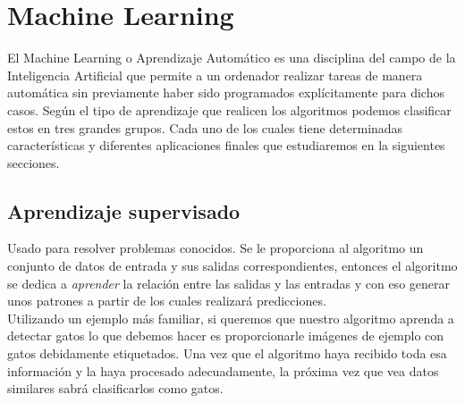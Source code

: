 \section{Machine Learning}
\label{sec:machine_learning}

El Machine Learning o Aprendizaje Automático es una disciplina del campo de la Inteligencia Artificial que permite a un ordenador realizar tareas de manera automática sin previamente haber sido programados explícitamente para dichos casos. Según el tipo de aprendizaje que realicen los algoritmos podemos clasificar estos en tres grandes grupos. Cada uno de los cuales tiene determinadas características y diferentes aplicaciones finales que estudiaremos en la siguientes secciones.

\subsection{Aprendizaje supervisado}
\label{sec:aprendizaje_supervisado}

Usado para resolver problemas conocidos. Se le proporciona al algoritmo un conjunto de datos de entrada y sus salidas correspondientes, entonces el algoritmo se dedica a \textit{aprender} la relación entre las salidas y las entradas y con eso generar unos patrones a partir de los cuales realizará predicciones.\\

Utilizando un ejemplo más familiar, si queremos que nuestro algoritmo aprenda a detectar gatos lo que debemos hacer es proporcionarle imágenes de ejemplo con gatos debidamente etiquetados. Una vez que el algoritmo haya recibido toda esa información y la haya procesado adecuadamente, la próxima vez que vea datos similares sabrá clasificarlos como gatos.\\

